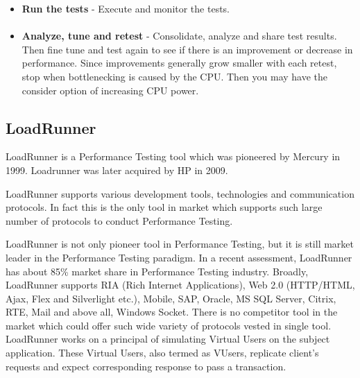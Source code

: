 \documentclass[../thesis.tex]{subfiles}
\begin{document}
\begin{itemize}
\paragraph{}
\item \textbf{Run the tests} - Execute and monitor the tests.
\paragraph{}
\item \textbf{Analyze, tune and retest} - Consolidate, analyze and share test results. Then fine tune and test again to see if there is an improvement or decrease in performance. Since improvements generally grow smaller with each retest, stop when bottlenecking is caused by the CPU. Then you may have the consider option of increasing CPU power.
\end{itemize}
\subsection{LoadRunner}
LoadRunner is a Performance Testing tool which was pioneered by Mercury in 1999. Loadrunner was later acquired by HP in 2009.

LoadRunner supports various development tools, technologies and communication protocols. In fact this is the only tool in market which supports such large number of protocols to conduct Performance Testing.

LoadRunner is not only pioneer tool in Performance Testing, but it is still market leader in the Performance Testing paradigm. In a recent assessment, LoadRunner has about 85\% market share in Performance Testing industry. 
Broadly, LoadRunner supports RIA (Rich Internet Applications), Web 2.0 (HTTP/HTML, Ajax, Flex and Silverlight etc.), Mobile, SAP, Oracle, MS SQL Server, Citrix, RTE, Mail and above all, Windows Socket. There is no competitor tool in the market which could offer such wide variety of protocols vested in single tool.
LoadRunner works on a principal of simulating Virtual Users on the subject application. These Virtual Users, also termed as VUsers, replicate client's requests and expect corresponding response to pass a transaction.
\end{document}

